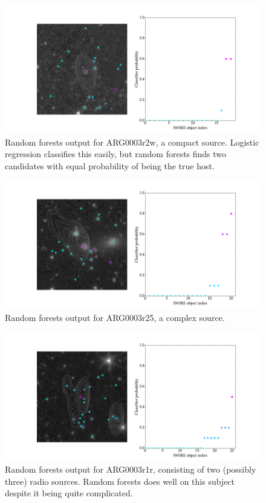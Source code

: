 \documentclass[a4paper]{article}
\begin{document}
    \begin{figure}[!ht]
      \centering
      \includegraphics[width=\linewidth]{images/ARG0003r2w_rf.pdf}
      \caption{Random forests output for ARG0003r2w, a compact source. Logistic regression classifies this easily, but random forests finds two candidates with equal probability of being the true host.}
      \label{fig:ARG0003r2w_rf}
    \end{figure}

    \begin{figure}[!ht]
      \centering
      \includegraphics[width=\linewidth]{images/ARG0003r25_rf.pdf}
      \caption{Random forests output for ARG0003r25, a complex source.}
      \label{fig:ARG0003r25_rf}
    \end{figure}

    \begin{figure}[!ht]
      \centering
      \includegraphics[width=\linewidth]{images/ARG0003r1r_rf.pdf}
      \caption{Random forests output for ARG0003r1r, consisting of two (possibly three) radio sources. Random forests does well on this subject despite it being quite complicated.}
      \label{fig:ARG0003r1r_rf}
    \end{figure}
\end{document}
